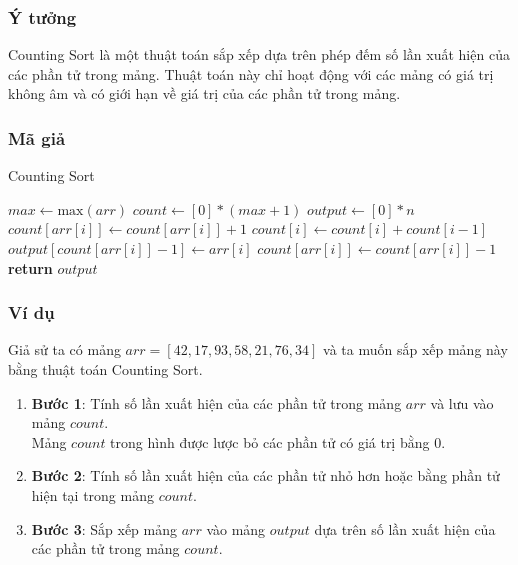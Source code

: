 \subsubsection{Ý tưởng}

Counting Sort là một thuật toán sắp xếp dựa trên phép đếm số lần xuất hiện của các phần tử trong mảng. Thuật toán này chỉ hoạt động với các mảng có giá trị không âm và có giới hạn về giá trị của các phần tử trong mảng. \cite{cormen2001}

\subsubsection{Mã giả}

\begin{algorithm}[H]
\caption{Counting Sort}
\begin{algorithmic}[1]
    \State $max \gets \text{max}(arr)$
    \State $count \gets [0] * (max + 1)$
    \State $output \gets [0] * n$
        \State $count[arr[i]] \gets count[arr[i]] + 1$
    \EndFor
        \State $count[i] \gets count[i] + count[i - 1]$
    \EndFor
        \State $output[count[arr[i]] - 1] \gets arr[i]$
        \State $count[arr[i]] \gets count[arr[i]] - 1$
    \EndFor
    \State \textbf{return} $output$
\EndFunction
\end{algorithmic}
\end{algorithm}

\subsubsection{Ví dụ}

Giả sử ta có mảng $arr = [42, 17, 93, 58, 21, 76, 34]$ và ta muốn sắp xếp mảng này bằng thuật toán Counting Sort.
\begin{enumerate}
    \item \textbf{Bước 1}: Tính số lần xuất hiện của các phần tử trong mảng $arr$ và lưu vào mảng $count$.\\Mảng $count$ trong hình được lược bỏ các phần tử có giá trị bằng $0$.
    \item \textbf{Bước 2}: Tính số lần xuất hiện của các phần tử nhỏ hơn hoặc bằng phần tử hiện tại trong mảng $count$.
    \item \textbf{Bước 3}: Sắp xếp mảng $arr$ vào mảng $output$ dựa trên số lần xuất hiện của các phần tử trong mảng $count$.
\end{enumerate}

